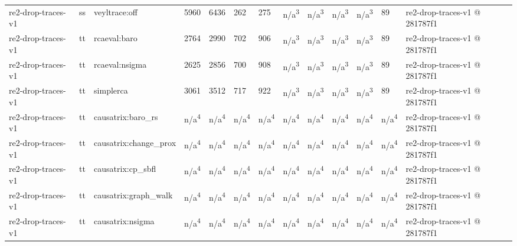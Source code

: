 \begin{table}[t]
\begin{tabular}{lllllllllllll}
re2-drop-traces-v1 & ss & veyltrace:off & 5960 & 6436 & 262 & 275 & n/a\textsuperscript{3} & n/a\textsuperscript{3} & n/a\textsuperscript{3} & n/a\textsuperscript{3} & 89 & re2-drop-traces-v1 @ 281787f1 \\
re2-drop-traces-v1 & tt & rcaeval:baro & 2764 & 2990 & 702 & 906 & n/a\textsuperscript{3} & n/a\textsuperscript{3} & n/a\textsuperscript{3} & n/a\textsuperscript{3} & 89 & re2-drop-traces-v1 @ 281787f1 \\
re2-drop-traces-v1 & tt & rcaeval:nsigma & 2625 & 2856 & 700 & 908 & n/a\textsuperscript{3} & n/a\textsuperscript{3} & n/a\textsuperscript{3} & n/a\textsuperscript{3} & 89 & re2-drop-traces-v1 @ 281787f1 \\
re2-drop-traces-v1 & tt & simplerca & 3061 & 3512 & 717 & 922 & n/a\textsuperscript{3} & n/a\textsuperscript{3} & n/a\textsuperscript{3} & n/a\textsuperscript{3} & 89 & re2-drop-traces-v1 @ 281787f1 \\
re2-drop-traces-v1 & tt & causatrix:baro\_rs & n/a\textsuperscript{4} & n/a\textsuperscript{4} & n/a\textsuperscript{4} & n/a\textsuperscript{4} & n/a\textsuperscript{4} & n/a\textsuperscript{4} & n/a\textsuperscript{4} & n/a\textsuperscript{4} & n/a\textsuperscript{4} & re2-drop-traces-v1 @ 281787f1 \\
re2-drop-traces-v1 & tt & causatrix:change\_prox & n/a\textsuperscript{4} & n/a\textsuperscript{4} & n/a\textsuperscript{4} & n/a\textsuperscript{4} & n/a\textsuperscript{4} & n/a\textsuperscript{4} & n/a\textsuperscript{4} & n/a\textsuperscript{4} & n/a\textsuperscript{4} & re2-drop-traces-v1 @ 281787f1 \\
re2-drop-traces-v1 & tt & causatrix:cp\_sbfl & n/a\textsuperscript{4} & n/a\textsuperscript{4} & n/a\textsuperscript{4} & n/a\textsuperscript{4} & n/a\textsuperscript{4} & n/a\textsuperscript{4} & n/a\textsuperscript{4} & n/a\textsuperscript{4} & n/a\textsuperscript{4} & re2-drop-traces-v1 @ 281787f1 \\
re2-drop-traces-v1 & tt & causatrix:graph\_walk & n/a\textsuperscript{4} & n/a\textsuperscript{4} & n/a\textsuperscript{4} & n/a\textsuperscript{4} & n/a\textsuperscript{4} & n/a\textsuperscript{4} & n/a\textsuperscript{4} & n/a\textsuperscript{4} & n/a\textsuperscript{4} & re2-drop-traces-v1 @ 281787f1 \\
re2-drop-traces-v1 & tt & causatrix:nsigma & n/a\textsuperscript{4} & n/a\textsuperscript{4} & n/a\textsuperscript{4} & n/a\textsuperscript{4} & n/a\textsuperscript{4} & n/a\textsuperscript{4} & n/a\textsuperscript{4} & n/a\textsuperscript{4} & n/a\textsuperscript{4} & re2-drop-traces-v1 @ 281787f1 \\

\end{tabular}
\end{table}
